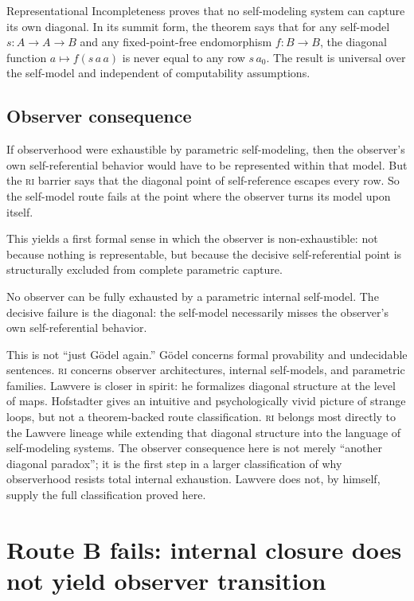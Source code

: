 \documentclass[11pt]{article}
\theoremstyle{plain}
\theoremstyle{definition}
\theoremstyle{remark}
\newcommand{\RI}{\textsc{ri}}
\begin{document}
Representational Incompleteness proves that no self-modeling system can
capture its own diagonal.  In its summit form, the theorem says that for
any self-model $s : A \to A \to B$ and any fixed-point-free endomorphism
$f : B \to B$, the diagonal function $a \mapsto f(s\,a\,a)$ is never
equal to any row $s\,a_0$.  The result is universal over the self-model
and independent of computability assumptions.

\subsection*{Observer consequence}

If observerhood were exhaustible by parametric self-modeling, then the
observer's own self-referential behavior would have to be represented
within that model.  But the \RI{} barrier says that the diagonal point of
self-reference escapes every row.  So the self-model route fails at the
point where the observer turns its model upon itself.

This yields a first formal sense in which the observer is
non-exhaustible: not because nothing is representable, but because the
decisive self-referential point is structurally excluded from complete
parametric capture.

\begin{keybox}[title={Route A is blocked}]
No observer can be fully exhausted by a parametric internal self-model.
The decisive failure is the diagonal: the self-model necessarily misses
the observer's own self-referential behavior.
\end{keybox}

This is not ``just G\"odel again.''  G\"odel concerns formal provability
and undecidable sentences.  \RI{} concerns observer architectures,
internal self-models, and parametric families.  Lawvere is closer in
spirit: he formalizes diagonal structure at the level of maps.
Hofstadter gives an intuitive and psychologically vivid picture of strange
loops, but not a theorem-backed route classification.  \RI{} belongs most
directly to the Lawvere lineage while extending that diagonal structure
into the language of self-modeling systems.  The observer consequence here
is not merely ``another diagonal paradox''; it is the first step in a
larger classification of why observerhood resists total internal
exhaustion.  Lawvere does not, by himself, supply the full classification
proved here.

\section{Route B fails: internal closure does not yield observer transition}
\label{sec:routeB}
\end{document}
